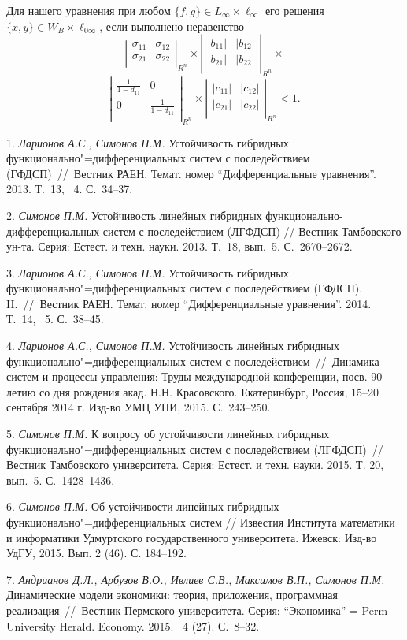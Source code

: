 Для нашего уравнения при любом $\{ f,g\} \in L_{\infty}\times \ell_{\infty}$ его решения $\{ x,y\} \in W_{B}\times \ell_{0\infty}$, если выполнено неравенство
$$
\left|\begin{array}{cc}
\sigma_{11} & \sigma_{12} \\
\sigma_{21} & \sigma_{22} \\
\end{array}\right|_{R^n} \times
\left|\begin{array}{cc}
|b_{11}| & |b_{12}| \\
|b_{21}| & |b_{22}| \\
\end{array}\right|_{R^n}\times
$$
$$
\left|\begin{array}{cc}
\frac{1}{1-d_{11}} & 0 \\
0 & \frac{1}{1-d_{11}} \\
\end{array}\right|_{R^n}\times
\left|\begin{array}{cc}
|c_{11}| & |c_{12}| \\
|c_{21}| & |c_{22}| \\
\end{array}\right|_{R^n} < 1.
$$


\litlist

1.
{\it Ларионов А.С., Симонов П.М.} Устойчивость гибридных функционально"=дифференциальных систем с последействием (ГФДСП)~//~Вестник РАЕН. Темат. номер ``Дифференциальные уравнения''. 2013. Т.~13, \No~4. С.~34--37.

2.
{\it Симонов П.М.}	Устойчивость линейных гибридных фу\-н\-к\-ци\-о\-на\-ль\-но-ди\-ф\-фе\-рен\-ци\-аль\-ных систем с последействием (ЛГФДСП) // Вестник Тамбовского ун-та. Серия: Естест. и техн. науки. 2013. Т.~18, вып.~5. С.~2670--2672.


3.
{\it Ларионов А.С., Симонов П.М.} Устойчивость гибридных функционально"=дифференциальных систем с последействием (ГФДСП). II.~//~Вестник РАЕН. Темат. номер ``Дифференциальные уравнения''. 2014. Т.~14, \No~5. С.~38--45.

4.
{\it Ларионов А.С., Симонов П.М.} Устойчивость линейных гибридных функционально"=дифференциальных систем с последействием~//~Динамика систем и процессы управления: Труды международной конференции, посв. 90-летию со дня рождения акад. Н.Н. Красовского. Екатеринбург, Россия, 15--20 сентября 2014 г. Изд-во УМЦ УПИ, 2015. С.~243--250.

5.
{\it Симонов П.М.} К вопросу об устойчивости линейных гибридных функционально"=дифференциальных систем с последействием (ЛГФДСП)~// Вестник Тамбовского университета. Серия: Естест. и техн. науки. 2015. Т. 20, вып.~5. С.~1428--1436.

6.
{\it Симонов П.М.} Об устойчивости линейных гибридных функционально"=дифференциальных систем // Известия Института математики и информатики Удмуртского государственного университета. Ижевск: Изд-во УдГУ, 2015. Вып. 2 (46). С. 184--192.


7.
{\it Андрианов Д.Л., Арбузов В.О., Ивлиев С.В., Максимов В.П., Симонов П.М.} Динамические модели экономики: теория, приложения, программная реализация~//~Вестник Пермского университета. Серия: ``Экономика'' = Perm University Herald. Economy. 2015. \No~4 (27). С.~8--32.
